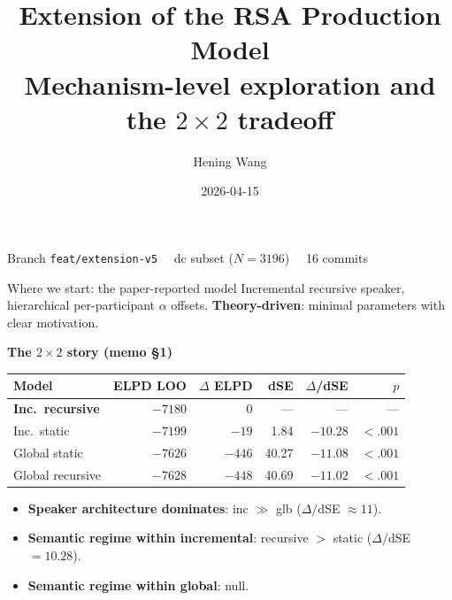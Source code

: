 \documentclass[10pt,aspectratio=169]{beamer}
\title{Extension of the RSA Production Model\\
\large Mechanism-level exploration and the $2\!\times\!2$ tradeoff}
\author{Hening Wang}
\date{2026-04-15}
\newcommand{\main}[1]{\textcolor{CSP-main-dark}{\textbf{#1}}}
\newcommand{\emp}[1]{\textcolor{CSP-emphasis}{\textbf{#1}}}
\newcommand{\muted}[1]{\textcolor{CSP-text-light}{#1}}
\begin{document}
\begin{frame}
\titlepage
\begin{center}
\muted{Branch \texttt{feat/extension-v5} \ \textbullet\  dc subset ($N = 3196$) \ \textbullet\  16 commits}
\end{center}
\end{frame}

\begin{frame}{Where we start: the paper-reported model}
\small
Incremental recursive speaker, hierarchical per-participant $\alpha$ offsets. \main{Theory-driven}: minimal parameters with clear motivation.

\vspace{0.4em}
\emp{The $2\!\times\!2$ story (memo \S1)}
\begin{center}
\begin{tabular}{lrrrrr}
\toprule
Model & ELPD LOO & $\Delta$ ELPD & dSE & $\Delta$/dSE & $p$\\
\midrule
\main{Inc.\ recursive} & \main{$-7180$} & $0$ & --- & --- & ---\\
Inc.\ static           & $-7199$ & $-19$  & 1.84  & $-10.28$ & $<.001$\\
Global static          & $-7626$ & $-446$ & 40.27 & $-11.08$ & $<.001$\\
Global recursive       & $-7628$ & $-448$ & 40.69 & $-11.02$ & $<.001$\\
\bottomrule
\end{tabular}
\end{center}

\vspace{0.4em}
\begin{itemize}\itemsep0.25em
  \item \main{Speaker architecture dominates}: inc $\gg$ glb ($\Delta/$dSE $\approx 11$).
  \item \main{Semantic regime within incremental}: recursive $>$ static ($\Delta/$dSE $= 10.28$).
  \item \main{Semantic regime within global}: null.
\end{itemize}
\end{frame}
\end{document}
